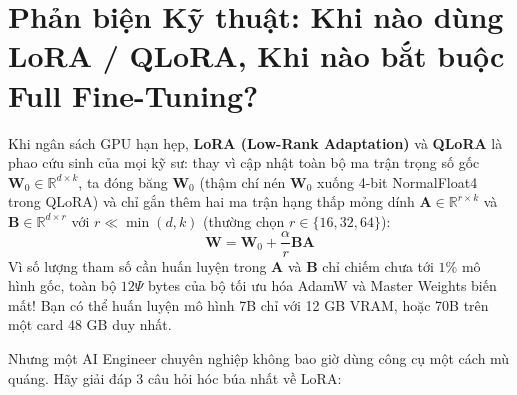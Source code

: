 \section{Phản biện Kỹ thuật: Khi nào dùng LoRA / QLoRA, Khi nào bắt buộc Full Fine-Tuning?}
\label{sec:lora_vs_full}

Khi ngân sách GPU hạn hẹp, \textbf{LoRA (Low-Rank Adaptation)} \citep{hu2022lora} và \textbf{QLoRA} \citep{dettmers2023qlora} là phao cứu sinh của mọi kỹ sư: thay vì cập nhật toàn bộ ma trận trọng số gốc $\mathbf{W}_0 \in \mathbb{R}^{d \times k}$, ta đóng băng $\mathbf{W}_0$ (thậm chí nén $\mathbf{W}_0$ xuống 4-bit NormalFloat4 trong QLoRA) và chỉ gắn thêm hai ma trận hạng thấp mỏng dính $\mathbf{A} \in \mathbb{R}^{r \times k}$ và $\mathbf{B} \in \mathbb{R}^{d \times r}$ với $r \ll \min(d, k)$ (thường chọn $r \in \{16, 32, 64\}$):
\begin{equation}
  \mathbf{W} = \mathbf{W}_0 + \frac{\alpha}{r} \mathbf{B}\mathbf{A}
  \label{eq:lora_formula}
\end{equation}
Vì số lượng tham số cần huấn luyện trong $\mathbf{A}$ và $\mathbf{B}$ chỉ chiếm chưa tới $1\%$ mô hình gốc, toàn bộ $12\Psi$ bytes của bộ tối ưu hóa AdamW và Master Weights biến mất! Bạn có thể huấn luyện mô hình 7B chỉ với 12 GB VRAM, hoặc 70B trên một card 48 GB duy nhất.

Nhưng một AI Engineer chuyên nghiệp không bao giờ dùng công cụ một cách mù quáng. Hãy giải đáp 3 câu hỏi hóc búa nhất về LoRA:

